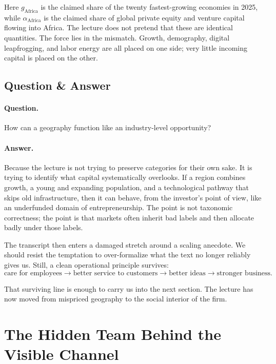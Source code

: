Here \(g_{\mathrm{Africa}}\) is the claimed share of the twenty fastest-growing economies in 2025, while \(\alpha_{\mathrm{Africa}}\) is the claimed share of global private equity and venture capital flowing into Africa. The lecture does not pretend that these are identical quantities. The force lies in the mismatch. Growth, demography, digital leapfrogging, and labor energy are all placed on one side; very little incoming capital is placed on the other.

\subsection{Question \& Answer}

\paragraph{Question.} How can a geography function like an industry-level opportunity?

\paragraph{Answer.} Because the lecture is not trying to preserve categories for their own sake. It is trying to identify what capital systematically overlooks. If a region combines growth, a young and expanding population, and a technological pathway that skips old infrastructure, then it can behave, from the investor's point of view, like an underfunded domain of entrepreneurship. The point is not taxonomic correctness; the point is that markets often inherit bad labels and then allocate badly under those labels.

The transcript then enters a damaged stretch around a scaling anecdote. We should resist the temptation to over-formalize what the text no longer reliably gives us. Still, a clean operational principle survives:
\begin{equation}
\text{care for employees}
\to
\text{better service to customers}
\to
\text{better ideas}
\to
\text{stronger business}.
\end{equation}

That surviving line is enough to carry us into the next section. The lecture has now moved from mispriced geography to the social interior of the firm.

\section{The Hidden Team Behind the Visible Channel}

